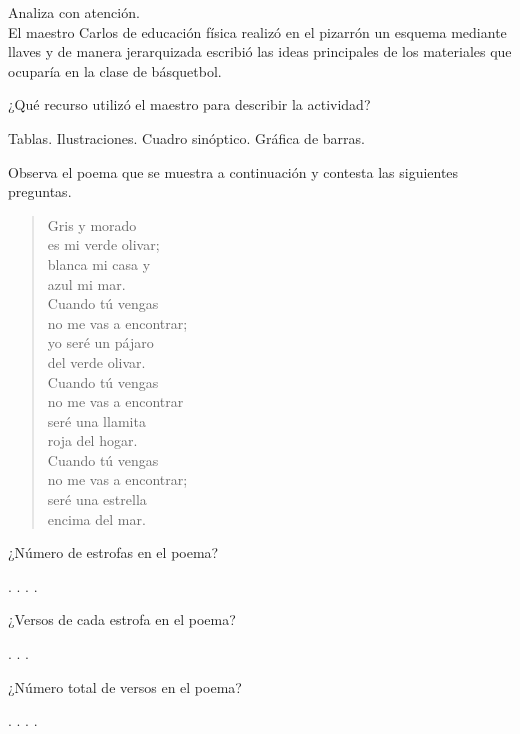 \documentclass[12pt]{exam}
\begin{document}
\begin{questions}
\medskip
Analiza con atención.
\\[0.5em]
El maestro Carlos de educación física  realizó  en el pizarrón un esquema mediante llaves y de manera  jerarquizada escribió  las ideas  principales  de los materiales que ocuparía en la clase de básquetbol.

\question ¿Qué recurso utilizó el maestro para describir la actividad?
\\[0.5em]
\begin{oneparchoices}
\choice Tablas.
\choice Ilustraciones.
\choice Cuadro sinóptico.
\choice Gráfica de barras.
\end{oneparchoices}

\medskip
Observa el poema que se muestra a continuación y contesta las siguientes preguntas.

\begin{verse}
Gris y morado \\
es mi verde olivar; \\
blanca mi casa y \\
azul mi mar.
\\[0.75em]
Cuando tú vengas \\
no me vas a encontrar; \\
yo seré un pájaro \\
del verde olivar.
\\[0.75em]
Cuando tú vengas \\
no me vas a encontrar \\
seré una llamita \\
roja del hogar.
\\[0.75em]
Cuando tú vengas \\
no me vas a encontrar; \\
seré una estrella \\
encima del mar.
\end{verse}

\question ¿Número de estrofas en el poema?
\\[0.5em]
\begin{oneparchoices}
.
.
.
.
\end{oneparchoices}

\question ¿Versos de cada estrofa en el poema?
\\[0.5em]
\begin{oneparchoices}
.
.
.
\end{oneparchoices}

\question ¿Número total de versos en el poema?
\\[0.5em]
\begin{oneparchoices}
.
.
.
.
\end{oneparchoices}

\end{questions}
\end{document}
